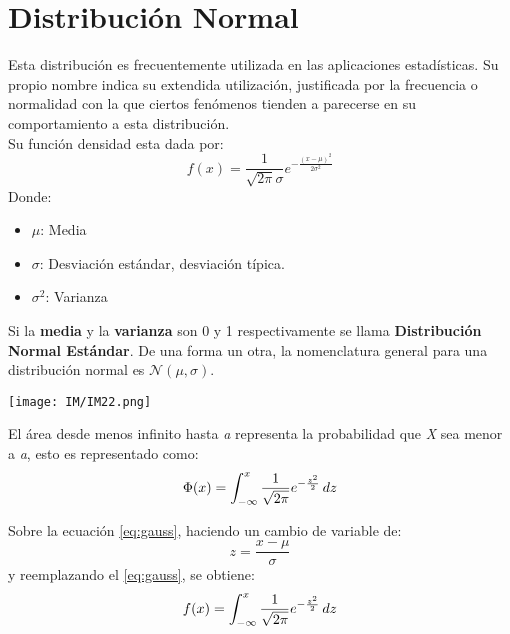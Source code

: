 \documentclass[
	12pt, %
	fleqn, %
	a4paper, %
	oneside, %
]{LegrandOrangeBook}
\begin{document}
\section{Distribución Normal}
\begin{definition}
Esta distribución es frecuentemente utilizada en las aplicaciones estadísticas. Su propio nombre indica su extendida utilización, justificada por la frecuencia o normalidad con la que ciertos fenómenos tienden a parecerse en su comportamiento a esta distribución.\\
Su función densidad esta dada por:
\begin{equation}
f(x)=\frac{1}{\sqrt{2\pi}\sigma}e^{-\frac{(x-\mu)^2}{2\sigma^2}}
\label{eq:gauss}
\end{equation}
Donde:
\begin{itemize}
\item $\mu$: Media
\item $\sigma$: Desviación estándar, desviación típica.
\item $\sigma^2$: Varianza
\end{itemize}
Si la \textbf{media} y la \textbf{varianza} son 0 y 1 respectivamente se llama \textbf{Distribución Normal Estándar}. De una forma un otra, la nomenclatura general para una distribución normal es $\mathcal{N}(\mu,\sigma)$.
\begin{center}
\texttt{[image: IM/IM22.png]}
\end{center}
\end{definition}
\begin{definition}
El área desde menos infinito hasta \textit{a} representa la probabilidad que \textit{X} sea menor a \textit{a}, esto es representado como:
\begin{equation}
\Phi(x)=\int_{-\infty}^x\frac{1}{\sqrt{2\pi}}e^{-\frac{z^2}{2}}\mathop{}\!d z
\end{equation}
\end{definition}
Sobre la ecuación \ref{eq:gauss}, haciendo un cambio de variable de:
\begin{equation}
z=\frac{x-\mu}{\sigma}
\label{eq:int gauss}
\end{equation}
y reemplazando el \ref{eq:gauss}, se obtiene:
\begin{equation}
f(x)=\int_{-\infty}^x\frac{1}{\sqrt{2\pi}}e^{-\frac{z^2}{2}}\mathop{}\!d z
\label{eq:z dist}
\end{equation}
\end{document}
